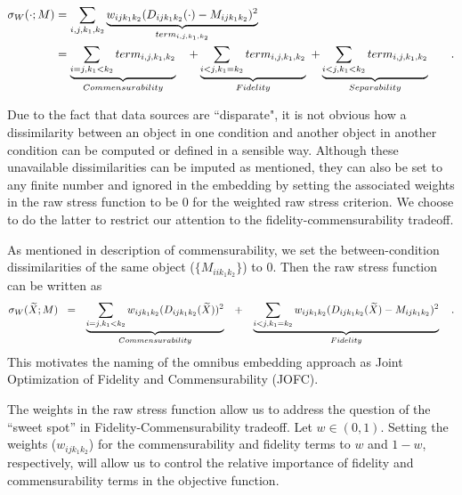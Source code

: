 \documentclass[12pt]{article} %
\begin{document}
\begin{align}
\sigma_W(\cdot;M)  &=  \sum_{i,j,k_1,k_2} \underbrace{{w_{ij{k_1}{k_2}}(D_{ij{k_1}{k_2}}(\cdot)-M_{ijk_1k_2})^2 }}_{term_{i,j,k_1,k_2}}  & \notag\\
\hspace{3pt} &=  \underbrace{\sum_{i=j,k_1<k_2}  term_{i,j,k_1,k_2}}_{Commensurability}  \hspace{10pt}    +  \underbrace{\sum_{i<j,k_1=k_2}   term_{i,j,k_1,k_2}  } _{Fidelity}
\hspace{3pt}+  \underbrace{\sum_{i< j,k_1<k_2}  term_{i,j,k_1,k_2}  } _{Separability}\label{eq:FidCommSep}\hspace{10pt} &.
\end{align}

   Due to the fact that data sources are ``disparate", it is not obvious how  a dissimilarity between an object in one condition and another object in another condition  can be computed or  defined in a sensible way. Although these unavailable dissimilarities can be imputed as mentioned,  they can  also be set to any finite number and ignored in the embedding by setting the associated weights in the raw stress function to be 0 for the weighted raw stress criterion. We choose to do the latter to  restrict our attention to  the fidelity-commensurability tradeoff. 

 As mentioned in description of commensurability, we set the between-condition dissimilarities of the same object ($\{M_{iik_1k_2}\}$) to $0$. Then the raw stress function can be written as
\begin{align}
\sigma_W(\widetilde{X};M)\hspace{3pt}   
\hspace{3pt}&=&\underbrace{\sum_{i=j,k_1< k_2}  {w_{ij{k_1}{k_2}}(D_{ij{k_1}{k_2}}(\widetilde{X}))^2}}_{Commensurability}  \hspace{10pt}  &  +&\underbrace{\sum_{i< j,k_1=k_2}  {w_{ij{k_1}{k_2}}(D_{ij{k_1}{k_2}}(\widetilde{X})-M_{ijk_1k_2})^2  }  } _{Fidelity}\notag\label{eq:FidCommSep}\hspace{10pt} .
\end{align}
This motivates  the naming of the   omnibus embedding approach as Joint Optimization of Fidelity and Commensurability (JOFC).



 The weights in the raw stress function allow us to address the question of the ``sweet spot'' in Fidelity-Commensurability tradeoff. Let $w \in (0,1)$. Setting the weights ($w_{ijk_1k_2}$)  for the commensurability  and fidelity  terms    to $w$ and $1-w$, respectively,  will allow us to control the relative importance of fidelity and commensurability terms in the objective function.
\end{document}
